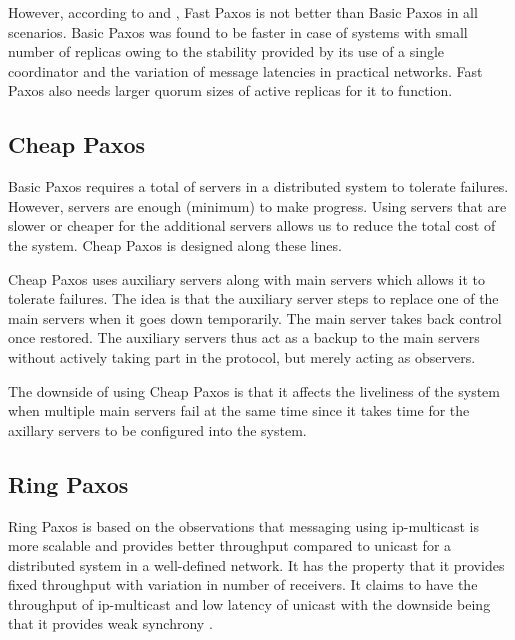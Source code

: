 However, according to \citet{Vieira08theperformance} and \citet{Junqueira2007},
Fast Paxos is not better than Basic Paxos in all scenarios. Basic Paxos was
found to be faster in case of systems with small number of replicas owing to
the stability provided by its use of a single coordinator and the variation
of message latencies in practical networks. Fast Paxos also needs larger quorum
sizes of active replicas for it to function.

\subsection{Cheap Paxos}

Basic Paxos requires a total of  servers in a distributed system to
tolerate  failures. However,  servers are enough (minimum) to
make progress.
Using servers that are slower or cheaper for the additional  servers
allows us to reduce the total cost of the system. Cheap Paxos \citep{LamportM04}
is designed along these lines.

Cheap Paxos uses  auxiliary servers along with  main servers
which allows it to tolerate  failures. The idea is that the auxiliary
server steps to replace one of the main servers when it goes down
temporarily. The main server takes back control once restored. The auxiliary
servers thus act as a backup to the main servers without actively taking part
in the protocol, but merely acting as observers.

The downside of using Cheap Paxos is that it affects the liveliness of the
system when multiple main servers fail at the same time since it takes time
for the axillary servers to be configured into the system.

\subsection{Ring Paxos}

Ring Paxos \citep{MarandiPSP10} is based on the observations that messaging
using ip-multicast%
is more scalable and provides better throughput compared
to unicast%
for a distributed system in a well-defined network. It
has the property that it provides fixed throughput with variation in number
of receivers. It claims to have the throughput of ip-multicast and low latency
of unicast with the downside being that it provides weak synchrony%
.

